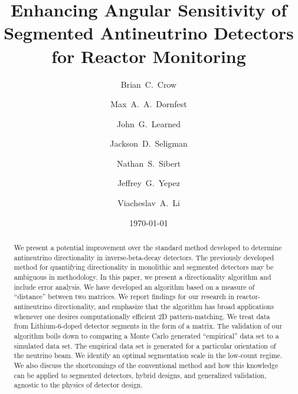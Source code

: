 \documentclass[tightenlines,twocolumn,prl,notitlepage,nofootinbib,preprintnumbers,longbibliography]{revtex4-1}
\begin{document}
\title{Enhancing Angular Sensitivity of Segmented Antineutrino Detectors for Reactor Monitoring}

\author{Brian~C.~Crow}
\author{Max~A.~A.~Dornfest}
\author{John~G.~Learned}
\author{Jackson~D.~Seligman}
\author{Nathan~S.~Sibert}
\author{Jeffrey~G.~Yepez}
\author{Viacheslav~A.~Li}

\date{\today}

\begin{abstract}
We present a potential improvement over the standard method developed to determine antineutrino directionality in inverse-beta-decay detectors. The previously developed method for quantifying directionality in monolithic and segmented detectors may be ambiguous in methodology. In this paper, we present a directionality algorithm and include error analysis. We have developed an algorithm based on a measure of ``distance'' between two matrices. We report findings for our research in reactor-antineutrino directionality, and emphasize that the algorithm has broad applications whenever one desires computationally efficient 2D pattern-matching.
We treat data from Lithium-6-doped detector segments in the form of a matrix.
The validation of our algorithm boils down to comparing a Monte Carlo generated ``empirical'' data set to a simulated data set. 
The empirical data set is generated for a particular orientation of the neutrino beam. 
We identify an optimal segmentation scale in the low-count regime.
We also discuss the shortcomings of the conventional method and how this knowledge can be applied to segmented detectors, hybrid designs, and generalized validation, agnostic to the physics of detector design.
\end{abstract}
\maketitle 
\end{document}
